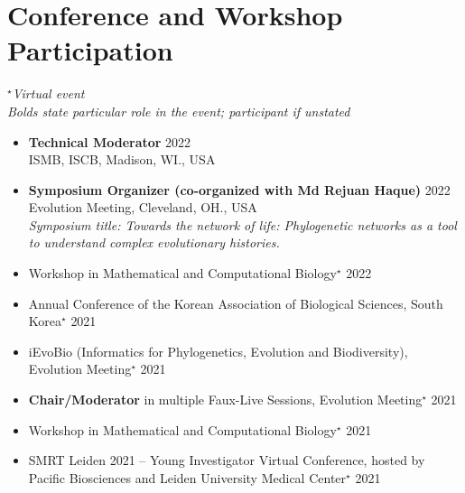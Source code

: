 \documentclass[11pt,letterpaper,sans]{moderncv} %
\begin{document}
\section{Conference and Workshop Participation}
\textit{$^\star$Virtual event\\
Bolds state particular role in the event; participant if unstated} 
\vspace{-0.25cm}\\
\begin{itemize}
	\item \textbf{Technical Moderator}  \hfill{2022}\\
	ISMB, ISCB, Madison, WI., USA
	
	\item \textbf{Symposium Organizer (co-organized with Md Rejuan Haque) } \hfill{2022}\\
	Evolution Meeting, Cleveland, OH., USA\\
	{\small \textit{Symposium title: Towards the network of life: Phylogenetic networks as a tool to understand complex evolutionary histories.}}
	
	\item Workshop in Mathematical and Computational Biology$^\star$ \hfill{2022}
	
	\item Annual Conference of the Korean Association of Biological Sciences, South Korea$^\star$ \hfill{2021}	
	
	\item iEvoBio (Informatics for Phylogenetics, Evolution and Biodiversity), Evolution Meeting$^\star$ \hfill{2021}
	
	\item \textbf{Chair/Moderator} in multiple Faux-Live Sessions, Evolution Meeting$^\star$ \hfill{2021}
	
	\item Workshop in Mathematical and Computational Biology$^\star$ \hfill{2021}	
	
	\item SMRT Leiden 2021 – Young Investigator Virtual Conference, hosted by Pacific Biosciences and Leiden University Medical Center$^\star$ \hfill{2021}	
	


\end{itemize}
\end{document}
